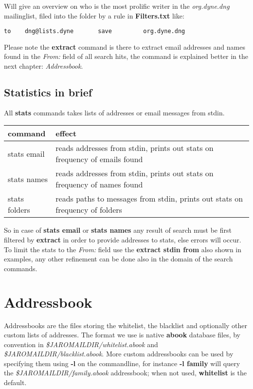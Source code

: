 \documentclass[a4,onecolumn,portrait]{article}
\begin{document}
Will give an overview on who is the most prolific writer in the \emph{org.dyne.dng} mailinglist, filed into the folder by a rule in \textbf{Filters.txt} like:

\begin{verbatim}
to    dng@lists.dyne       save         org.dyne.dng
\end{verbatim}

Please note the \textbf{extract} command is there to extract email addresses and names found in the \emph{From:} field of all search hits, the command is explained better in the next chapter: \emph{Addressbook}.

\subsection{Statistics in brief}
\label{sec-8-1}

All \textbf{stats} commands takes lists of addresses or email messages from stdin.

\begin{center}
\begin{tabular}{ll}
command & effect\\
\hline
stats email & reads addresses from stdin, prints out stats on frequency of emails found\\
stats names & reads addresses from stdin, prints out stats on frequency of names found\\
stats folders & reads paths to messages from stdin, prints out stats on frequency of folders\\
\end{tabular}
\end{center}

So in case of \textbf{stats email} or \textbf{stats names} any result of search must be first filtered by \textbf{extract} in order to provide addresses to stats, else errors will occur. To limit the stats to the \emph{From:} field use the \textbf{extract stdin from} also shown in examples, any other refinement can be done also in the domain of the search commands.
\section{Addressbook}
\label{sec-9}

Addressbooks are the files storing the whitelist, the blacklist and optionally other custom lists of addresses. The format we use is native \textbf{abook} database files, by convention in \emph{\$JAROMAILDIR/whitelist.abook} and \emph{\$JAROMAILDIR/blacklist.abook}. More custom addressbooks can be used by specifying them using \textbf{-l} on the commandline, for instance \textbf{-l family} will query the \emph{\$JAROMAILDIR/family.abook} addressbook; when not used, \textbf{whitelist} is the default.
\end{document}
